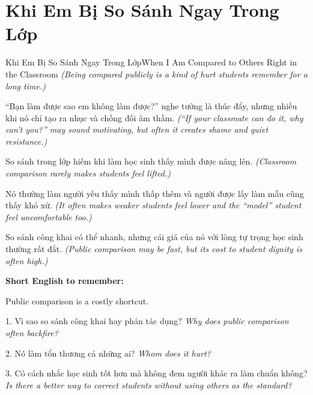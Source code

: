 \section{Khi Em Bị So Sánh Ngay Trong Lớp}
\begin{truyen}{Khi Em Bị So Sánh Ngay Trong Lớp}{When I Am Compared to Others Right in the Classroom}
\textit{(Being compared publicly is a kind of hurt students remember for a long time.)}

“Bạn làm được sao em không làm được?” nghe tưởng là thúc đẩy, nhưng nhiều khi nó chỉ tạo ra nhục và chống đối âm thầm.
\textit{(“If your classmate can do it, why can't you?” may sound motivating, but often it creates shame and quiet resistance.)}

So sánh trong lớp hiếm khi làm học sinh thấy mình được nâng lên.
\textit{(Classroom comparison rarely makes students feel lifted.)}

Nó thường làm người yếu thấy mình thấp thêm và người được lấy làm mẫu cũng thấy khó xử.
\textit{(It often makes weaker students feel lower and the “model” student feel uncomfortable too.)}
\end{truyen}

\begin{baihoc}
So sánh công khai có thể nhanh, nhưng cái giá của nó với lòng tự trọng học sinh thường rất đắt.
\textit{(Public comparison may be fast, but its cost to student dignity is often high.)}
\end{baihoc}

\begin{ghinhoanh}
\textbf{Short English to remember:}

Public comparison is a costly shortcut.

\end{ghinhoanh}

\begin{tuhocnhanh}
1. Vì sao so sánh công khai hay phản tác dụng? \textit{Why does public comparison often backfire?}

2. Nó làm tổn thương cả những ai? \textit{Whom does it hurt?}

3. Có cách nhắc học sinh tốt hơn mà không đem người khác ra làm chuẩn không? \textit{Is there a better way to correct students without using others as the standard?}
\end{tuhocnhanh}
\ngancach

